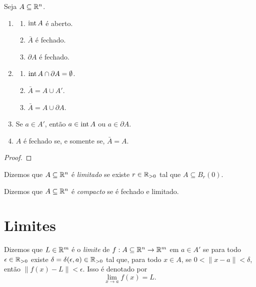 \begin{proposition}
    Seja $A \subseteq \mathbb{R}^n$. 
        \begin{enumerate}[leftmargin=*, align=left, label=\textbf{(\alph*)}]
            \item 
                \begin{enumerate}[label=\roman*.]
                    \item $\operatorname{int}{A}$ é aberto.
                    \item $\bar{A}$ é fechado.
                    \item $\partial A$ é fechado.
                \end{enumerate}
            \item 
                \begin{enumerate}[label=\roman*.]
                    \item $\operatorname{int}{A} \cap \partial A = \emptyset$.
                    \item $\bar{A} = A \cup A'$.
                    \item $\bar{A} = A \cup \partial A$.
                \end{enumerate}
            \item Se $a \in A'$, então $a \in \operatorname{int}{A}$ ou $a \in \partial A$.
            \item $A$ é fechado se, e somente se, $\bar{A} = A$.
        \end{enumerate}
\end{proposition}

\begin{proof}
    \blackproof
\end{proof}

\begin{definition}
    Dizemos que $A \subseteq \mathbb{R}^n$ é \emph{limitado} se existe $r \in \mathbb{R}_{>0}$ tal que $A \subseteq B_r(0)$.
\end{definition}

\begin{definition}
    Dizemos que $A \subseteq \mathbb{R}^n$ é \emph{compacto} se é fechado e limitado.
\end{definition}

\section{Limites}

\begin{definition}
    Dizemos que $L \in \mathbb{R}^m$ é o \emph{limite} de $f : A \subseteq \mathbb{R}^n \to \mathbb{R}^m$ em $a \in A'$ se para todo $\epsilon \in \mathbb{R}_{>0}$ existe $\delta = \delta(\epsilon, a) \in \mathbb{R}_{>0}$ tal que, para todo $x \in A$, se $0 < \| x-a \| < \delta$, então $\| f(x)-L \| < \epsilon$. Isso é denotado por 
        \[
            \lim_{x \to a} f(x) = L.
        \]
\end{definition}


